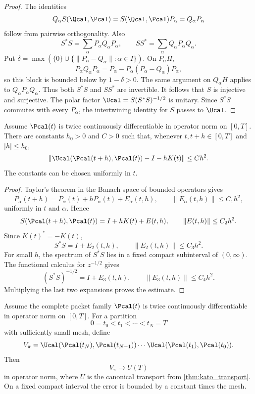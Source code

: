 \begin{proof}
The identities
\[
Q_\alpha S(\Qcal,\Pcal)
=
S(\Qcal,\Pcal)P_\alpha
=
Q_\alpha P_\alpha
\]
follow from pairwise orthogonality.  Also
\[
S^*S
=
\sum_\alpha P_\alpha Q_\alpha P_\alpha,
\qquad
SS^*
=
\sum_\alpha Q_\alpha P_\alpha Q_\alpha.
\]
Put $\delta=\max(\{0\}\cup\{\|P_\alpha-Q_\alpha\|:\alpha\in I\})$.  On $P_\alpha H$,
\[
P_\alpha Q_\alpha P_\alpha
=
P_\alpha-P_\alpha(P_\alpha-Q_\alpha)P_\alpha,
\]
so this block is bounded below by $1-\delta>0$.  The same argument on $Q_\alpha H$ applies to $Q_\alpha P_\alpha Q_\alpha$.  Thus both $S^*S$ and $SS^*$ are invertible.  It follows that $S$ is injective and surjective.  The polar factor $\Ucal=S(S^*S)^{-1/2}$ is unitary.  Since $S^*S$ commutes with every $P_\alpha$, the intertwining identity for $S$ passes to $\Ucal$.
\end{proof}

\begin{lemma}\label{lem:one_step_direct_rotation}
Assume $\Pcal(t)$ is twice continuously differentiable in operator norm on $[0,T]$.  There are constants $h_0>0$ and $C>0$ such that, whenever $t,t+h\in[0,T]$ and $|h|\le h_0$,
\[
\left\|
\Ucal(\Pcal(t+h),\Pcal(t))
-
I
-
hK(t)
\right\|
\le
Ch^2.
\]
The constants can be chosen uniformly in $t$.
\end{lemma}

\begin{proof}
Taylor's theorem in the Banach space of bounded operators gives
\[
P_\alpha(t+h)
=
P_\alpha(t)+h\dot P_\alpha(t)+E_{\alpha}(t,h),
\qquad
\|E_{\alpha}(t,h)\|\le C_1h^2,
\]
uniformly in $t$ and $\alpha$.  Hence
\[
S(\Pcal(t+h),\Pcal(t))
=
I+hK(t)+E(t,h),
\qquad
\|E(t,h)\|\le C_2h^2.
\]
Since $K(t)^*=-K(t)$,
\[
S^*S=I+E_2(t,h),
\qquad
\|E_2(t,h)\|\le C_3h^2.
\]
For small $h$, the spectrum of $S^*S$ lies in a fixed compact subinterval of $(0,\infty)$.  The functional calculus for $z^{-1/2}$ gives
\[
(S^*S)^{-1/2}=I+E_3(t,h),
\qquad
\|E_3(t,h)\|\le C_4h^2.
\]
Multiplying the last two expansions proves the estimate.
\end{proof}

\begin{theorem}\label{thm:direct_rotation_convergence}
Assume the complete packet family $\Pcal(t)$ is twice continuously differentiable in operator norm on $[0,T]$.  For a partition
\[
0=t_0<t_1<\cdots<t_N=T
\]
with sufficiently small mesh, define
\[
V_\pi
=
\Ucal(\Pcal(t_N),\Pcal(t_{N-1}))
\cdots
\Ucal(\Pcal(t_1),\Pcal(t_0)).
\]
Then
\[
V_\pi\longrightarrow U(T)
\]
in operator norm, where $U$ is the canonical transport from \cref{thm:kato_transport}.  On a fixed compact interval the error is bounded by a constant times the mesh.
\end{theorem}

